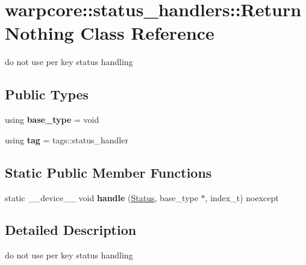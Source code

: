 \hypertarget{classwarpcore_1_1status__handlers_1_1ReturnNothing}{}\section{warpcore\+:\+:status\+\_\+handlers\+:\+:Return\+Nothing Class Reference}
\label{classwarpcore_1_1status__handlers_1_1ReturnNothing}


do not use per key status handling  


\subsection*{Public Types}
\begin{DoxyCompactItemize}
\item 
\mbox{\label{classwarpcore_1_1status__handlers_1_1ReturnNothing_a65d2b010981c319e7dbd6afe4972ffe3}} 
using {\bfseries base\+\_\+type} = void
\item 
\mbox{\label{classwarpcore_1_1status__handlers_1_1ReturnNothing_a729fe655e5a481393f7a23a6076d5c48}} 
using {\bfseries tag} = tags\+::status\+\_\+handler
\end{DoxyCompactItemize}
\subsection*{Static Public Member Functions}
\begin{DoxyCompactItemize}
\item 
\mbox{\label{classwarpcore_1_1status__handlers_1_1ReturnNothing_ac7915e26369a35dd460ebff0424475b8}} 
static \+\_\+\+\_\+device\+\_\+\+\_\+ void {\bfseries handle} (\hyperlink{classwarpcore_1_1Status}{Status}, base\+\_\+type $\ast$, index\+\_\+t) noexcept
\end{DoxyCompactItemize}


\subsection{Detailed Description}
do not use per key status handling 